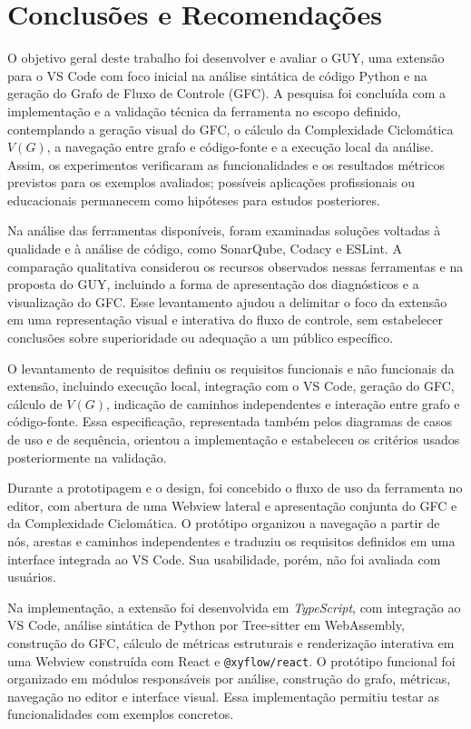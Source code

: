 \chapter{Conclusões e Recomendações}
\label{cap:06}
\label{cap:conclusoes}

O objetivo geral deste trabalho foi desenvolver e avaliar o GUY, uma extensão para o VS Code com foco inicial na análise sintática de código Python e na geração do Grafo de Fluxo de Controle (GFC). A pesquisa foi concluída com a implementação e a validação técnica da ferramenta no escopo definido, contemplando a geração visual do GFC, o cálculo da Complexidade Ciclomática \(V(G)\), a navegação entre grafo e código-fonte e a execução local da análise. Assim, os experimentos verificaram as funcionalidades e os resultados métricos previstos para os exemplos avaliados; possíveis aplicações profissionais ou educacionais permanecem como hipóteses para estudos posteriores.

Na análise das ferramentas disponíveis, foram examinadas soluções voltadas à qualidade e à análise de código, como SonarQube, Codacy e ESLint. A comparação qualitativa considerou os recursos observados nessas ferramentas e na proposta do GUY, incluindo a forma de apresentação dos diagnósticos e a visualização do GFC. Esse levantamento ajudou a delimitar o foco da extensão em uma representação visual e interativa do fluxo de controle, sem estabelecer conclusões sobre superioridade ou adequação a um público específico.

O levantamento de requisitos definiu os requisitos funcionais e não funcionais da extensão, incluindo execução local, integração com o VS Code, geração do GFC, cálculo de \(V(G)\), indicação de caminhos independentes e interação entre grafo e código-fonte. Essa especificação, representada também pelos diagramas de casos de uso e de sequência, orientou a implementação e estabeleceu os critérios usados posteriormente na validação.

Durante a prototipagem e o design, foi concebido o fluxo de uso da ferramenta no editor, com abertura de uma Webview lateral e apresentação conjunta do GFC e da Complexidade Ciclomática. O protótipo organizou a navegação a partir de nós, arestas e caminhos independentes e traduziu os requisitos definidos em uma interface integrada ao VS Code. Sua usabilidade, porém, não foi avaliada com usuários.

Na implementação, a extensão foi desenvolvida em \textit{TypeScript}, com integração ao VS Code, análise sintática de Python por Tree-sitter em WebAssembly, construção do GFC, cálculo de métricas estruturais e renderização interativa em uma Webview construída com React e \texttt{@xyflow/react}. O protótipo funcional foi organizado em módulos responsáveis por análise, construção do grafo, métricas, navegação no editor e interface visual. Essa implementação permitiu testar as funcionalidades com exemplos concretos.

